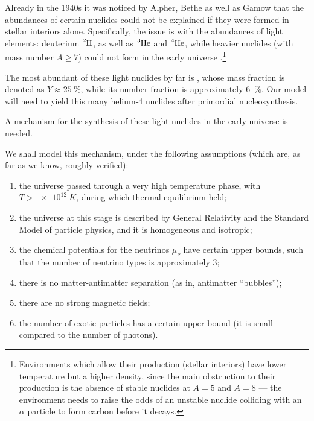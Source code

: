 \documentclass[main.tex]{subfiles}
\begin{document}
Already in the 1940s it was noticed by Alpher, Bethe as well as Gamow that the abundances of certain nuclides could not be explained if they were formed in stellar interiors alone. 
Specifically, the issue is with the abundances of light elements: deuterium \(\ce{^{2}H}\), as well as \(\ce{^{3}He}\) and \(\ce{^{4}He}\), while heavier nuclides (with mass number \(A \geq 7\)) could not form in the early universe \cite[sec.\ 8.6.1]{colespCosmology2002}.\footnote{Environments which allow their production (stellar interiors) have lower temperature but a higher density, since the main obstruction to their production is the absence of stable nuclides at \(A = 5\) and \(A= 8\) --- the environment needs to raise the odds of an unstable  nuclide colliding with an \(\alpha \) particle to form carbon before it decays.}

The most abundant of these light nuclides by far is , whose mass fraction is denoted as \(Y \approx \SI{25}{\percent}\), while its number fraction is approximately \SI{6}{\percent}. Our model will need to yield this many helium-4 nuclides after primordial nucleosynthesis. 

A mechanism for the synthesis of these light nuclides in the early universe is needed. 

We shall model this mechanism, under the following assumptions (which are, as far as we know, roughly verified):
%
\begin{enumerate}
    \item the universe passed through a very high temperature phase, with \(T > \SI{e12}{K}\), during which thermal equilibrium held;
    \item the universe at this stage is described by General Relativity and the Standard Model of particle physics, and it is homogeneous and isotropic;
    \item the chemical potentials for the neutrinos \(\mu_{\nu }\) have certain upper bounds, such that the number of neutrino types is approximately 3; 
    \item there is no matter-antimatter separation (as in, antimatter ``bubbles'');
    \item there are no strong magnetic fields;
    \item the number of exotic particles has a certain upper bound (it is small compared to the number of photons).
\end{enumerate}
\end{document}
